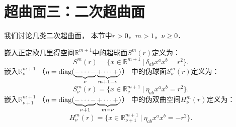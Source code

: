 
\section{超曲面三：二次超曲面}\label{chsm:sec_Hyperquadric}

我们讨论几类二次超曲面\cite[p.108]{oneill1983}，
本节中$r>0$，$m>1$，$\nu \geqslant 0$．


嵌入正定欧几里得空间$\mathbb{R}^{m+1}$中的{\heiti 超球面}$S^m(r)$定义为：
\begin{equation}\label{chsm:eqn_hpsphere}
    S^m(r) = \{x\in\mathbb{R}^{m+1} \ |\ \delta_{ab} x^a x^b = r^2 \} .
\end{equation}
嵌入$\mathbb{R}^{m+1}_\nu$
（$\eta={\rm diag}(\underbrace{-\cdots-}_\nu \underbrace{+\cdots+}_{m+1-\nu})$）
中的{\heiti 伪球面}$S^m_\nu(r)$定义为：
\begin{equation}\label{chsm:eqn_pseudo-sphere}
    S^m_\nu(r) = \{x\in\mathbb{R}^{m+1}_\nu \ |\ \eta_{ab} x^a x^b = r^2 \} .
\end{equation}
嵌入$\mathbb{R}^{m+1}_{\nu+1}$
（$\eta={\rm diag}(\underbrace{-\cdots-}_{\nu+1} \underbrace{+\cdots+}_{m-\nu})$）
中的{\heiti 伪双曲空间}$H^m_{\nu}(r)$定义为：
\begin{equation}\label{chsm:eqn_pseudo-hyperbolic}
    H^m_{\nu}(r) = \{x\in\mathbb{R}^{m+1}_{\nu+1} \ |\ \eta_{ab} x^a x^b = -r^2 \} .
\end{equation}

